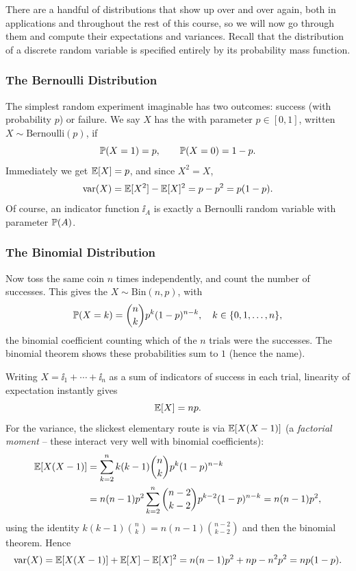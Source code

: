 \documentclass[a4paper]{scrartcl}
\begin{document}
There are a handful of distributions that show up over and over again, both in applications and throughout the rest of this course, so we will now go through them and compute their expectations and variances. Recall that the distribution of a discrete random variable is specified entirely by its probability mass function.

\subsubsection*{The Bernoulli Distribution}

The simplest random experiment imaginable has two outcomes: success (with probability $p$) or failure. We say $X$ has the  with parameter $p \in [0, 1]$, written $X \sim \mathrm{Bernoulli}(p)$, if
$$
\mathbb{P}(X = 1) = p, \qquad \mathbb{P}(X = 0) = 1 - p.
$$
Immediately we get $\mathbb{E}[X] = p$, and since $X^2 = X$,
$$
\operatorname{var}(X) = \mathbb{E}[X^2] - \mathbb{E}[X]^2 = p - p^2 = p(1-p).
$$
Of course, an indicator function $\ii_A$ is exactly a Bernoulli random variable with parameter $\mathbb{P}(A)$.

\subsubsection*{The Binomial Distribution}

Now toss the same coin $n$ times independently, and count the number of successes. This gives the  $X \sim \mathrm{Bin}(n, p)$, with
$$
\mathbb{P}(X = k) = \binom{n}{k} p^k (1 - p)^{n - k}, \quad k \in \{0, 1, \dots, n\},
$$
the binomial coefficient counting which of the $n$ trials were the successes. The binomial theorem shows these probabilities sum to $1$ (hence the name).

Writing $X = \ii_1 + \cdots + \ii_n$ as a sum of indicators of success in each trial, linearity of expectation instantly gives
$$
\mathbb{E}[X] = np.
$$
For the variance, the slickest elementary route is via $\mathbb{E}[X(X-1)]$ (a \emph{factorial moment} -- these interact very well with binomial coefficients):
\begin{align*}
	\mathbb{E}[X(X - 1)] &= \sum_{k = 2}^{n} k(k-1)\binom{n}{k}p^k (1-p)^{n - k} \\
	&= n(n-1)p^2 \sum_{k = 2}^{n} \binom{n - 2}{k - 2} p^{k - 2}(1 - p)^{n - k} = n(n - 1)p^2,
\end{align*}
using the identity $k(k-1)\binom{n}{k} = n(n-1)\binom{n-2}{k-2}$ and then the binomial theorem. Hence
$$
\operatorname{var}(X) = \mathbb{E}[X(X-1)] + \mathbb{E}[X] - \mathbb{E}[X]^2 = n(n-1)p^2 + np - n^2p^2 = np(1 - p).
$$
\end{document}
